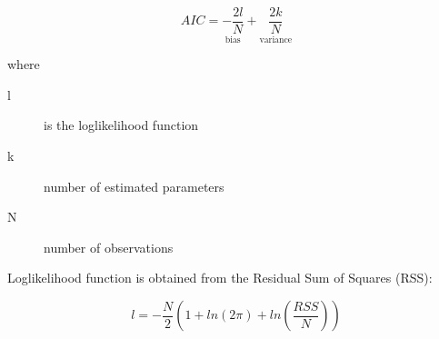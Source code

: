 \begin{equation}
\label{eq:aicformula}
AIC = \underset{\text{bias}}{-\frac{2l}{N}} + 
\underset{\text{variance}}{\frac{2k}{N}}
\end{equation}

\noindent where 

\begin{description}
\item[l] is the loglikelihood function
\item[k] number of estimated parameters
\item[N] number of observations
\end{description}

Loglikelihood function is obtained from the Residual Sum of Squares (RSS):

\begin{equation}
\label{eq:ll}
l = -\frac{N}{2} \left(1 + ln(2\pi) + ln\left(\frac{RSS}{N}\right)\right) 
\end{equation}

